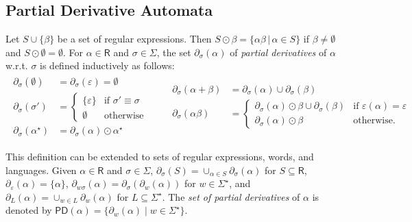 \documentclass{llncs}
\newcommand{\RE}{\mathsf{R}}
\newcommand{\PD}{\mathsf{PD}}
\newcommand{\Alphabet}{\Sigma}
\newcommand{\letter}{\sigma}
\begin{document}
\subsection{Partial Derivative Automata}
\label{sec:pd}
Let $S \cup \{\beta\}$ be a set of regular expressions. Then $S \odot
\beta = \{ \alpha\beta \, | \, \alpha \in S \}$ if $\beta \not=
\emptyset$ and $S \odot \emptyset = \emptyset$.  For $\alpha\in\RE$
and $\letter \in \Alphabet $, the set $\partial_\letter(\alpha)$ of
\emph{partial derivatives} of $\alpha$ w.r.t. $\letter$ is defined
inductively as follows:
{\small $$\begin{array}{ll}
\begin{array}{ll}
  \partial_\letter(\emptyset) &= \partial_\letter(\varepsilon) =
  \emptyset\\
  \partial_\letter(\letter') &= \left\{
  \begin{array}{ll}
    \{\varepsilon\} & \text{if } \letter' \equiv \letter\\
    \emptyset & \text{otherwise}
  \end{array}
  \right.\\
  \partial_\letter(\alpha^\star) &= \partial_\letter(\alpha)\odot\alpha^\star
\end{array} \ \ \ \ \ \ \ \ 
\begin{array}{ll}
  \partial_\letter(\alpha+\beta) &= \partial_\letter(\alpha) \cup
  \partial_\letter(\beta)\\
  \partial_\letter(\alpha\beta) &= \left\{  \begin{array}{ll}
     \partial_\letter(\alpha)\odot\beta \cup
 \partial_\letter(\beta) & \text{if }  \varepsilon(\alpha)=  \varepsilon\\
    \partial_\letter(\alpha)\odot\beta & \text{otherwise.}
 \end{array} \right.
\end{array}
\end{array}$$}

\noindent This definition can be extended to sets of regular
expressions, words, and languages.  Given $\alpha\in\RE$ and
$\letter\in \Alphabet$, $\partial_\letter(S) = \cup_{\alpha\in
  S}\partial_\letter(\alpha)$ for $S\subseteq \RE$,
$\partial_\varepsilon(\alpha) = \{\alpha\}$,
$\partial_{w\letter}(\alpha) = \partial_\letter(\partial_w(\alpha))$
for $w\in \Alphabet^\star$, and $\partial_{L}(\alpha) = \cup_{w\in
  L}\partial_w(\alpha)$ for $L\subseteq\Alphabet^\star$.  The
\emph{set of partial derivatives} of $\alpha$ is denoted by
$\PD(\alpha)=\{\partial_{w}(\alpha)\mid w\in \Alphabet^\star\}.$
\end{document}
